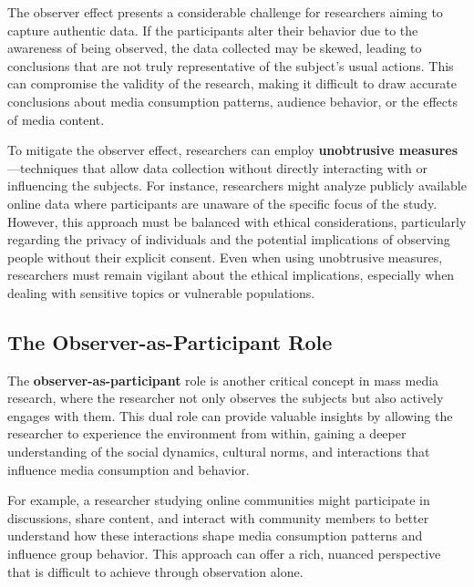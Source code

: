 \documentclass[
]{book}
\begin{document}
The observer effect presents a considerable challenge for researchers aiming to capture authentic data. If the participants alter their behavior due to the awareness of being observed, the data collected may be skewed, leading to conclusions that are not truly representative of the subject's usual actions. This can compromise the validity of the research, making it difficult to draw accurate conclusions about media consumption patterns, audience behavior, or the effects of media content.

To mitigate the observer effect, researchers can employ \textbf{unobtrusive measures}---techniques that allow data collection without directly interacting with or influencing the subjects. For instance, researchers might analyze publicly available online data where participants are unaware of the specific focus of the study. However, this approach must be balanced with ethical considerations, particularly regarding the privacy of individuals and the potential implications of observing people without their explicit consent. Even when using unobtrusive measures, researchers must remain vigilant about the ethical implications, especially when dealing with sensitive topics or vulnerable populations.

\subsection*{The Observer-as-Participant Role}\label{the-observer-as-participant-role}

The \textbf{observer-as-participant} role is another critical concept in mass media research, where the researcher not only observes the subjects but also actively engages with them. This dual role can provide valuable insights by allowing the researcher to experience the environment from within, gaining a deeper understanding of the social dynamics, cultural norms, and interactions that influence media consumption and behavior.

For example, a researcher studying online communities might participate in discussions, share content, and interact with community members to better understand how these interactions shape media consumption patterns and influence group behavior. This approach can offer a rich, nuanced perspective that is difficult to achieve through observation alone.
\end{document}
